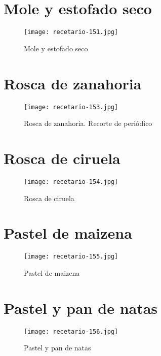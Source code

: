 \documentclass[12pt,letterpaper]{article}
\begin{document}
\section{Mole y estofado seco}
  \begin{figure}[H]
    \vspace{2pt}
  \texttt{[image: recetario-151.jpg]}
    \caption{Mole y estofado seco}
    
  \end{figure}


\newpage

\section{Rosca de zanahoria}
  \begin{figure}[H]
    \vspace{2pt}
  \texttt{[image: recetario-153.jpg]}
    \caption{Rosca de zanahoria. Recorte de periódico}
    
  \end{figure}


\newpage

\section{Rosca de ciruela}
  \begin{figure}[H]
    \vspace{2pt}
  \texttt{[image: recetario-154.jpg]}
    \caption{Rosca de ciruela}
    
  \end{figure}


\newpage

\section{Pastel de maizena}
  \begin{figure}[H]
    \vspace{2pt}
  \texttt{[image: recetario-155.jpg]}
    \caption{Pastel de maizena}
    
  \end{figure}


\newpage

\section{Pastel y pan de natas}
  \begin{figure}[H]
    \vspace{2pt}
  \texttt{[image: recetario-156.jpg]}
    \caption{Pastel y pan de natas}
    
  \end{figure}
\end{document}
